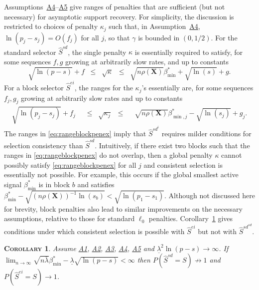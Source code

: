 \documentclass[
  12pt]{article}
\newcommand{\bX}{\mathbf{X}}
\newtheorem{cor}[thm]{\textsc{Corollary}}
\begin{document}
\noindent Assumptions~\hyperlink{lab:A4}{A4}--\hyperlink{lab:A5}{A5} give ranges of penalties that are sufficient (but not necessary) for asymptotic support recovery. For simplicity, the discussion is restricted to choices of penalty $\kappa_j$ such that, in Assumption~\hyperlink{lab:A4}{A4}, $\ln(p_j-s_j)=O(f_j)$ for all $j$, so that $\gamma$ is bounded in $(0,1/2)$. For the standard selector $\hat{S}^{sd}$, the single penalty $\kappa$ is essentially required to satisfy, for some sequences $f,g$ growing at arbitrarily slow rates, and up to constants
\begin{equation}\label{eq:rangepenex}
  \sqrt{\ln(p-s)}+ f\;\;\leq\;\;\sqrt{\kappa}\;\;\leq\;\;\sqrt{n\rho(\bX)}\beta^*_{\min}+\sqrt{\ln(s)} + g.	
\end{equation}
For a block selector $\hat{S}^{ei}$, the ranges for the $\kappa_j$'s essentially are, for some sequences $f_j,g_j$ growing at arbitrarily slow rates and up to constants
    \begin{eqnarray}\label{eq:rangeblockpenex}
      \sqrt{\ln(p_j-s_j)}+f_j\;\;&\leq\;\;\sqrt{\kappa_j}\;\;\leq&\;\;\sqrt{n\rho(\bX)}\beta^*_{\min,j}-\sqrt{\ln(s_j)} + g_j.   
    \end{eqnarray}
The ranges in \eqref{eq:rangeblockpenex} imply that $\hat{S}^{sd}^{i}$ requires milder conditions for selection consistency than $\hat{S}^{sd}$. Intuitively, if there exist two blocks such that the ranges in \eqref{eq:rangeblockpenex} do not overlap, then a global penalty $\kappa$ cannot possibly satisfy \eqref{eq:rangeblockpenex} for all $j$ and consistent selection is essentially not possible. For example, this occurs if the global smallest active signal $\beta_{\min}^*$ is in block $b$ and satisfies  $\beta_{\min}^* - \sqrt{(n\rho(\bX))^{-1} \ln(s_b)} < \sqrt{\ln(p_1-s_1)}$.
Although not discussed here for brevity, block penalties also lead to similar improvements on the necessary assumptions, relative to those for standard $\ell_0$ penalties. Corollary~\ref{cor:selconstimpossiblereg} gives conditions under which consistent selection is possible with $\hat{S}^{ei}$ but not with $\hat{S}^{sd}^{sd}$.
\begin{cor}\label{cor:selconstimpossiblereg}
Assume \hyperlink{lab:A1}{A1}, \hyperlink{lab:A2}{A2}, \hyperlink{lab:A3}{A3}, \hyperlink{lab:A4}{A4}, \hyperlink{lab:A5}{A5} and $\underline{\lambda}^2\ln(p-s)\to\infty$. If
$\lim_{n\to\infty}\sqrt{n\bar{\lambda}}\beta_{\min}^*-\underline{\lambda}\sqrt{\ln(p-s)}< \infty$
then 
$P(\hat{S}^{sd} = S)\not \to 1$ and $P(\hat{S}^{ei} = S)\to 1$.
\end{cor}
\end{document}
